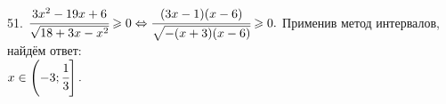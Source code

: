 51. $\cfrac{3x^2-19x+6}{\sqrt{18+3x-x^2}}\geqslant0\Leftrightarrow\cfrac{(3x-1)(x-6)}{\sqrt{-(x+3)(x-6)}}\geqslant0.$ Применив метод интервалов, найдём ответ:\\ $x\in\left(-3;\cfrac{1}{3}\right].$
\begin{figure}[ht!]
\end{figure}\newpage\noindent
